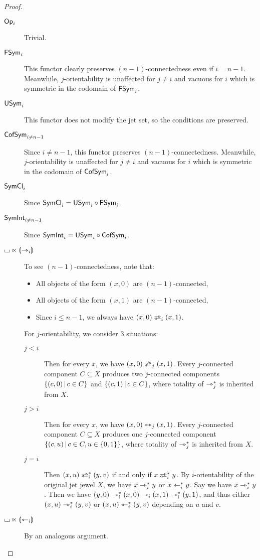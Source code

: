 \documentclass[a4paper]{memoir}
\begin{document}
\begin{proof}
	\begin{description}
		\item[${\mathsf{Op}}_i$] Trivial.
		\item[$\mathsf{FSym}_i$] This functor clearly preserves $(n-1)$-connectedness even if $i = n-1$. Meanwhile, $j$-orientability is unaffected for $j \neq i$ and vacuous for $i$ which is symmetric in the codomain of $\mathsf{FSym}_i$.
		\item[$\mathsf{USym}_i$] This functor does not modify the jet set, so the conditions are preserved.
		\item[$\mathsf{CofSym}_{i \neq n-1}$] Since $i \neq n-1$, this functor preserves $(n-1)$-connectedness. Meanwhile, $j$-orientability is unaffected for $j \neq i$ and vacuous for $i$ which is symmetric in the codomain of $\mathsf{CofSym}_i$.
		\item[$\mathsf{SymCl}_i$] Since $\mathsf{SymCl}_i = \mathsf{USym}_i \circ \mathsf{FSym}_i$.
		\item[$\mathsf{SymInt}_{i \neq n-1}$] Since $\mathsf{SymInt}_i = \mathsf{USym}_i \circ \mathsf{CofSym}_i$.
		\item[${\llcorner\hspace{-.4ex}\lrcorner} \ltimes {\llparenthesis \rightarrowtriangle_i \rrparenthesis}$] To see $(n-1)$-connectedness, note that:
		\begin{itemize}
			\item All objects of the form $(x, 0)$ are $(n-1)$-connected,
			\item All objects of the form $(x, 1)$ are $(n-1)$-connected,
			\item Since $i \leq n-1$, we always have $(x, 0) \infrajet_i (x, 1)$.
		\end{itemize}
		For $j$-orientability, we consider 3 situations:
		\begin{description}
			\item[$j < i$] Then for every $x$, we have $(x, 0) \not\infrajet_j (x, 1)$. Every $j$-connected component $C \subseteq X$ produces two $j$-connected components $\mathopen{}\left\{ (c, 0) \,\middle|\, c \in C \right\}\mathclose{}$ and $\mathopen{}\left\{ (c, 1) \,\middle|\, c \in C \right\}\mathclose{}$, where totality of $\rightarrowtriangle_j^*$ is inherited from $X$.
			\item[$j > i$] Then for every $x$, we have $(x, 0) \leftrightarrowtriangle_j (x, 1)$. Every $j$-connected component $C \subseteq X$ produces one $j$-connected component $\mathopen{}\left\{ (c, u) \,\middle|\, c \in C, u \in \mathopen{}\left\{ 0, 1 \right\}\mathclose{} \right\}\mathclose{}$, where totality of $\rightarrowtriangle_j^*$ is inherited from $X$.
			\item[$j = i$] Then $(x, u) \infrajet_i^* (y, v)$ if and only if $x \infrajet_i^* y$.
			By $i$-orientability of the original jet jewel $X$, we have $x \rightarrowtriangle_i^* y$ or $x \leftarrowtriangle_i^* y$. Say we have $x \rightarrowtriangle_i^* y$.
			Then we have $(y, 0) \rightarrowtriangle_i^* (x, 0) \rightarrowtriangle_i (x, 1) \rightarrowtriangle_i^* (y, 1)$, and thus either $(x, u) \rightarrowtriangle_i^* (y, v)$ or $(x, u) \leftarrowtriangle_i^* (y, v)$ depending on $u$ and $v$.
		\end{description}
		\item[${\llcorner\hspace{-.4ex}\lrcorner} \ltimes {\llparenthesis \leftarrowtriangle_i \rrparenthesis}$] By an analogous argument. \qedhere
	\end{description}
\end{proof}
\end{document}
